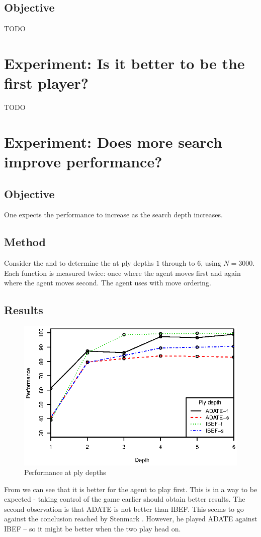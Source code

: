 \subsection*{Objective}
TODO

\section{Experiment: Is it better to be the first player?}
TODO

\section{Experiment: Does more search improve performance?}
\subsection*{Objective}
One expects the performance to increase as the search depth increases.
\subsection*{Method}
Consider the  and  to determine the  at ply depths $1$ through to $6$, using $N = 3000$.  Each function is measured twice: once where the agent moves first and again where the agent moves second.  The agent uses  with move ordering.
\subsection*{Results}
\begin{figure}[ht]
	\centering
		\includegraphics{artifacts/c4-350.eps}
	\caption{Performance at ply depths}
	\label{fig:patply}
\end{figure}
From  we can see that it is better for the agent to play first.  This is in a way to be expected - taking control of the game earlier should obtain better results.  The second observation is that ADATE is not better than IBEF.  This seems to go against the conclusion reached by Stenmark \cite{stenmark:masters}.  However, he played ADATE against IBEF -- so it might be better when the two play head on. 

